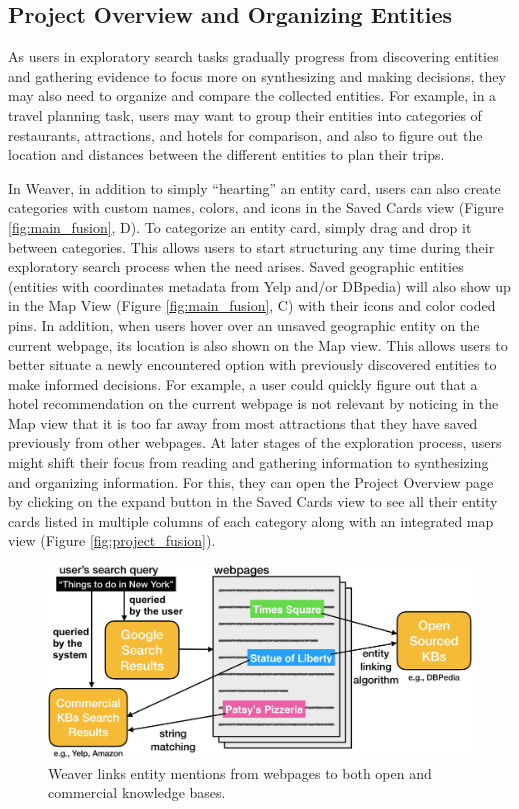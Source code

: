 \subsection{Project Overview and Organizing Entities}



As users in exploratory search tasks gradually progress from discovering entities and gathering evidence to focus more on synthesizing and making decisions, they may also need to organize and compare the collected entities. For example, in a travel planning task, users may want to group their entities into categories of restaurants, attractions, and hotels for comparison, and also to figure out the location and distances between the different entities to plan their trips.

In Weaver, in addition to simply ``hearting'' an entity card, users can also create categories with custom names, colors, and icons in the Saved Cards view (Figure \ref{fig:main_fusion}, D). To categorize an entity card, simply drag and drop it between categories. This allows users to start structuring any time during their exploratory search process when the need arises. Saved geographic entities (entities with coordinates metadata from Yelp and/or DBpedia) will also show up in the Map View  (Figure \ref{fig:main_fusion}, C) with their icons and color coded pins. In addition, when users hover over an unsaved geographic entity on the current webpage, its location is also shown on the Map view. This allows users to better situate a newly encountered option with previously discovered entities to make informed decisions. For example, a user could quickly figure out that a hotel recommendation on the current webpage is not relevant by noticing in the Map view that it is too far away from most attractions that they have saved previously from other webpages. At later stages of the exploration process, users might shift their focus from reading and gathering information to synthesizing and organizing information. For this, they can open the Project Overview page by clicking on the expand button in the Saved Cards view to see all their entity cards listed in multiple columns of each category along with an integrated map view (Figure \ref{fig:project_fusion}).

\begin{figure}
    \centering
    \includegraphics[width=0.5\columnwidth]{Chapters/Weaver/entity_linking2.png}
    \caption[Linking entities from webpages to open and commercial knowledge bases.]{Weaver links entity mentions from webpages to both open and commercial knowledge bases.}
    \label{fig:entity_linking_fusion}
\end{figure}

